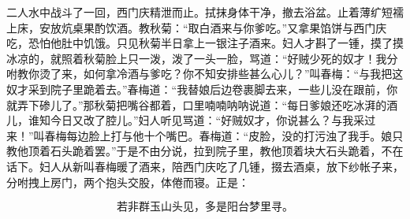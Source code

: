二人水中战斗了一回，西门庆精泄而止。拭抹身体干净，撤去浴盆。止着薄纩短襦上床，安放炕桌果酌饮酒。教秋菊：“取白酒来与你爹吃。”又拿果馅饼与西门庆吃，恐怕他肚中饥饿。只见秋菊半日拿上一银注子酒来。妇人才斟了一锺，摸了摸冰凉的，就照着秋菊脸上只一泼，泼了一头一脸，骂道：“好贼少死的奴才！我分咐教你烫了来，如何拿冷酒与爹吃？你不知安排些甚么心儿？”叫春梅：“与我把这奴才采到院子里跪着去。”春梅道：“我替娘后边卷裹脚去来，一些儿没在跟前，你就弄下碜儿了。”那秋菊把嘴谷都着，口里喃喃呐呐说道：“每日爹娘还吃冰湃的酒儿，谁知今日又改了腔儿。”妇人听见骂道：“好贼奴才，你说甚么？与我采过来！”叫春梅每边脸上打与他十个嘴巴。春梅道：“皮脸，没的打污浊了我手。娘只教他顶着石头跪着罢。”于是不由分说，拉到院子里，教他顶着块大石头跪着，不在话下。妇人从新叫春梅暖了酒来，陪西门庆吃了几锺，掇去酒桌，放下纱帐子来，分咐拽上房门，两个抱头交股，体倦而寝。正是：

\[
若非群玉山头见，多是阳台梦里寻。
\]
